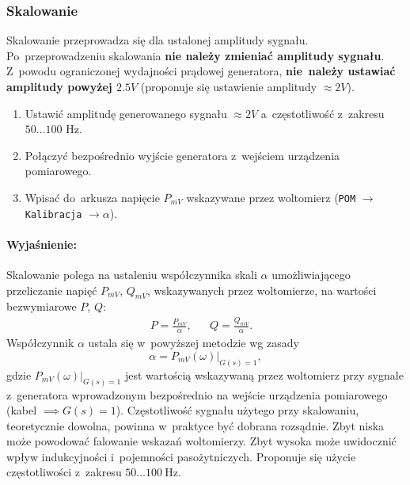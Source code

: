 \documentclass[paper=a4,DIV=12]{lpas}
\begin{document}
\subsubsection{Skalowanie}
\label{sec:XW8AC}

Skalowanie przeprowadza się dla ustalonej amplitudy sygnału. Po~przeprowadzeniu
skalowania \textbf{nie należy zmieniać amplitudy sygnału}. Z~powodu
ograniczonej wydajności prądowej generatora, \textbf{nie~należy ustawiać
amplitudy powyżej $2.5V$} (proponuje się ustawienie amplitudy $\approx 2V$).
\begin{enumerate}
  \item Ustawić amplitudę generowanego sygnału $\approx 2V$ a~częstotliwość
    z~zakresu $50\dots100\text{ Hz}$.
  \item Połączyć bezpośrednio wyjście generatora z~wejściem urządzenia
    pomiarowego.
  \item Wpisać do~arkusza napięcie $P_{mV}$ wskazywane przez woltomierz
    (\texttt{POM} $\rightarrow$ \texttt{Kalibracja} $\rightarrow \alpha$).
\end{enumerate}

\paragraph{Wyjaśnienie:} Skalowanie polega na ustaleniu współczynnika skali
$\alpha$ umożliwiającego przeliczanie napięć $P_{mV}$, $Q_{mV}$, wskazywanych
przez woltomierze, na wartości bezwymiarowe $P$, $Q$:
\begin{equation}
  \begin{aligned}
    & P = \frac{P_{mV}}{\alpha}, && Q = \frac{Q_{mV}}{\alpha}. &&
  \end{aligned}
  \label{eq:IP4D4}
\end{equation}
Współczynnik $\alpha$ ustala się w~powyższej metodzie wg zasady
\begin{equation}
  \alpha = \left.P_{mV}(\omega)\right|_{G(s) = 1},
  \label{eq:57L58}
\end{equation}
gdzie $\left.P_{mV}(\omega)\right|_{G(s) = 1}$ jest wartością wskazywaną przez
woltomierz przy sygnale z~generatora wprowadzonym bezpośrednio na wejście
urządzenia pomiarowego (kabel $\implies G(s) = 1$). Częstotliwość sygnału
użytego przy skalowaniu, teoretycznie dowolna, powinna w~praktyce być dobrana
rozsądnie. Zbyt niska może powodować falowanie wskazań woltomierzy. Zbyt wysoka
może uwidocznić wpływ indukcyjności i~pojemności pasożytniczych. Proponuje się
użycie częstotliwości z~zakresu $50\dots100~\text{Hz}$.
\end{document}
